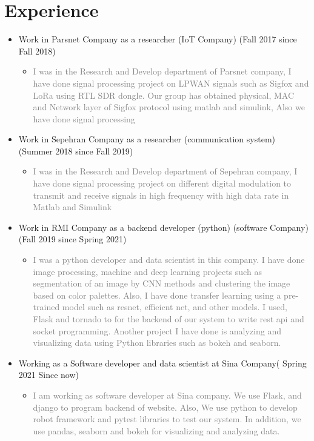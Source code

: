 \documentclass[10pt,a4paper,sans]{moderncv} %
\begin{document}
\section{Experience}
\begin{itemize}
\item Work in Parsnet Company as a  researcher (IoT Company) (Fall 2017 since Fall 2018)
\begin{itemize}
\item
\textcolor{gray}{I was in the Research and Develop department of Parsnet company, I have done signal processing project on LPWAN signals such as Sigfox and LoRa using RTL SDR dongle. Our group has obtained physical, MAC and Network layer of Sigfox protocol using matlab and simulink, Also we have done signal processing}
\end{itemize}
\item Work in Sepehran Company as a  researcher (communication system) (Summer 2018 since Fall 2019)
\begin{itemize}
\item
\textcolor{gray}{I was in the Research and Develop department of Sepehran company, I have done signal processing project on different digital modulation to transmit and receive signals in high frequency with high data rate in Matlab and Simulink}
\end{itemize}

\item Work in RMI Company as a backend developer (python) (software Company) (Fall 2019 since Spring 2021)
\begin{itemize}
\item
\textcolor{gray}{I was a python developer and data scientist in this company. I have done image processing, machine and deep learning projects such as segmentation of an image by CNN methods and clustering the image based on color palettes. Also, I have done transfer learning using a pre-trained model such as resnet, effieicnt net, and other models. I used, Flask and tornado to for the backend of our system to write rest api and socket programming.
Another project I have done is analyzing and visualizing data using Python libraries such as bokeh and seaborn.}
\end{itemize}

\item Working as a Software developer and data scientist at Sina Company( Spring 2021 Since now)
\begin{itemize}
\item
\textcolor{gray}{I am working as software developer at Sina company. We use Flask, and django to program backend of website. Also,
We use python to develop robot framework and pytest libraries to test our system. In addition, we use pandas, seaborn and bokeh for visualizing and analyzing data.}
\end{itemize}
\end{itemize}
\end{document}
